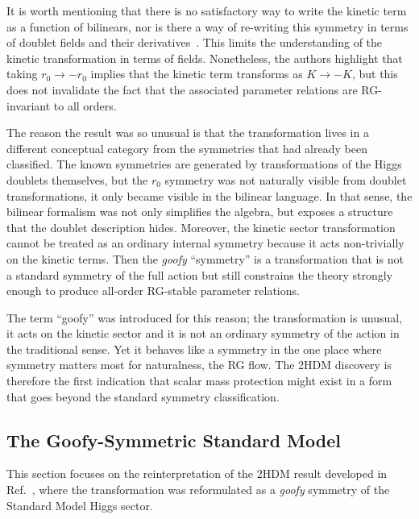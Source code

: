 \documentclass[a4paper, 11pt]{article}
\begin{document}
It is worth mentioning that there is no satisfactory way to write the kinetic term as a function of bilinears, nor is there a way of re-writing this symmetry in terms of doublet fields and their derivatives~\cite{2HDM}. This limits the understanding of the kinetic transformation in terms of fields. Nonetheless, the authors highlight that taking $r_0\to-r_0$ implies that the kinetic term transforms as $K\to-K$, but this does not invalidate the fact that the associated parameter relations are RG-invariant to all orders.

The reason the result was so unusual is that the transformation lives in a different conceptual category from the symmetries that had already been classified. The known symmetries are generated by transformations of the Higgs doublets themselves, but the $r_0$ symmetry was not naturally visible from doublet transformations, it only became visible in the bilinear language. In that sense, the bilinear formalism was not only simplifies the algebra, but exposes a structure that the doublet description hides. Moreover, the kinetic sector transformation cannot be treated as an ordinary internal symmetry because it acts non-trivially on the kinetic terms. Then the \textit{goofy} ``symmetry'' is a transformation that is not a standard symmetry of the full action but still constrains the theory strongly enough to produce all-order RG-stable parameter relations.

The term ``goofy'' was introduced for this reason; the transformation is unusual, it acts on the kinetic sector and it is not an ordinary symmetry of the action in the traditional sense. Yet it behaves like a symmetry in the one place where symmetry matters most for naturalness, the RG flow. The 2HDM discovery is therefore the first indication that scalar mass protection might exist in a form that goes beyond the standard symmetry classification.

\subsection{The Goofy-Symmetric Standard Model}
\label{sec:goofy_sm}

This section focuses on the reinterpretation of the 2HDM result developed in Ref.~\cite{Trautner_goofy1,goofy2,TrautnerGoofy}, where the transformation was reformulated as a \textit{goofy} symmetry of the Standard Model Higgs sector. 
\end{document}
